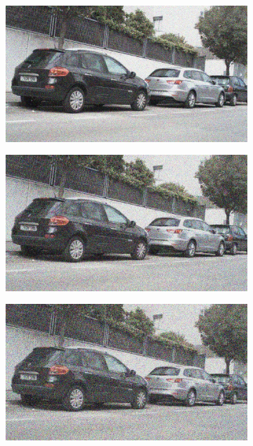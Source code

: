 \documentclass[a4paper]{ctexart}
\begin{document}
\begin{figure}[htbp]
\begin{subfigure}{0.08\textwidth}
			\label{fig：Gamma=0.9, Gauss Noise = 0.1}
		\end{subfigure}
		\begin{subfigure}{0.08\textwidth}
			\captionsetup{font=scriptsize}
			\includegraphics[width=\linewidth]{picture/Edge Detection/degrade/RGB_001 Gamma=0.9, Gauss Noise=0.2}
			\label{fig：Gamma=0.9, Gauss Noise = 0.2}
		\end{subfigure}
		\begin{subfigure}{0.08\textwidth}
			\captionsetup{font=scriptsize}
			\includegraphics[width=\linewidth]{picture/Edge Detection/degrade/RGB_001 Gamma=0.9, Gauss Noise=0.3}
			\label{fig：Gamma=0.9, Gauss Noise = 0.3}
		\end{subfigure}
		\begin{subfigure}{0.08\textwidth}
			\captionsetup{font=scriptsize}
			\includegraphics[width=\linewidth]{picture/Edge Detection/degrade/RGB_001 Gamma=0.9, Gauss Noise=0.4}

\end{subfigure}
\end{figure}
\end{document}
